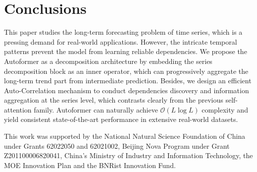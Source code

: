 \section{Conclusions}

This paper studies the long-term forecasting problem of time series, which is a pressing demand for real-world applications. However, the intricate temporal patterns prevent the model from learning reliable dependencies. We propose the Autoformer as a decomposition architecture by embedding the series decomposition block as an inner operator, which can progressively aggregate the long-term trend part from intermediate prediction. Besides, we design an efficient Auto-Correlation mechanism to conduct dependencies discovery and information aggregation at the series level, which contrasts clearly from the previous self-attention family. Autoformer can naturally achieve $\mathcal{O}(L\log L)$ complexity and yield consistent state-of-the-art performance in extensive real-world datasets. 

\begin{ack}
This work was supported by the National Natural Science Foundation of China under Grants 62022050 and 62021002, Beijing Nova Program under Grant Z201100006820041, China's Ministry of Industry and Information Technology, the MOE Innovation Plan and the BNRist Innovation Fund.
\end{ack}

\small

